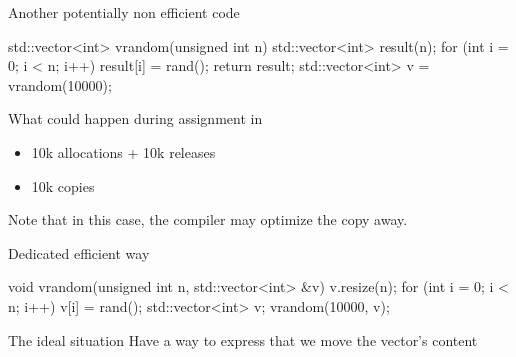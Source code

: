 \begin{frame}[fragile]
  \begin{exampleblock}{Another potentially non efficient code}
    \begin{cppcode*}{}
      std::vector<int> vrandom(unsigned int n) {
        std::vector<int> result(n);
        for (int i = 0; i < n; i++) {
          result[i] = rand();
        }
        return result;
      }
      std::vector<int> v = vrandom(10000);
    \end{cppcode*}
  \end{exampleblock}
  \pause
  \begin{alertblock}{What could happen during assignment in }
    \begin{itemize}
    \item 10k allocations + 10k releases
    \item 10k copies
    \end{itemize}
    Note that in this case, the compiler may optimize the copy away.
  \end{alertblock}
\end{frame}

\begin{frame}[fragile]
  \begin{exampleblock}{Dedicated efficient way}
    \begin{cppcode*}{}
      void vrandom(unsigned int n, std::vector<int> &v) {
        v.resize(n);
        for (int i = 0; i < n; i++) {
          v[i] = rand();
        }
      }
      std::vector<int> v;
      vrandom(10000, v);
    \end{cppcode*}
  \end{exampleblock}
  \pause
  \begin{block}{The ideal situation}
    Have a way to express that we move the vector's content
  \end{block}
\end{frame}

